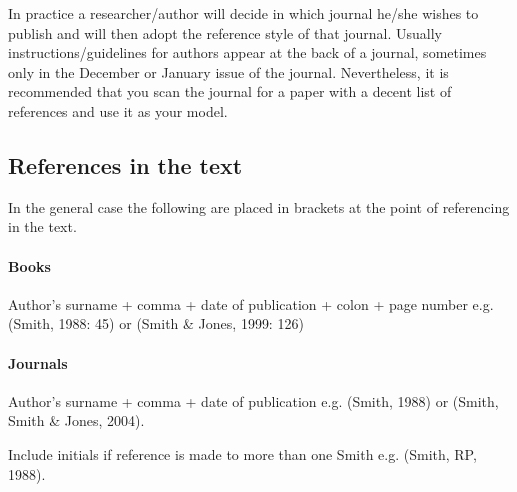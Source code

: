 \documentclass[a5paper, 10pt]{article}
\begin{document}
In practice a researcher/author will decide in which journal he/she
wishes to publish and will then adopt the reference style of that
journal.  Usually instructions/guidelines for authors appear at the
back of a journal, sometimes only in the December or January issue of
the journal.  Nevertheless, it is recommended that you scan the
journal for a paper with a decent list of references and use it as
your model.

\subsection{References in the text}

In the general case the following are placed in brackets at the point
of referencing in the text.

\paragraph{Books} Author's surname + comma + date of publication + colon +
page number e.g. (Smith, 1988: 45) or (Smith \& Jones, 1999: 126)

\paragraph{Journals} Author's surname + comma + date of publication e.g.
(Smith, 1988) or (Smith, Smith \& Jones, 2004).

Include initials if reference is made to more than one Smith e.g.
(Smith, RP, 1988).
\end{document}
